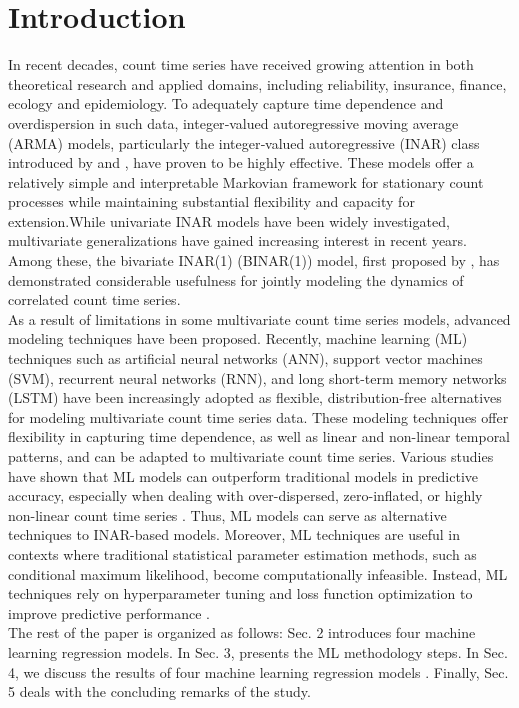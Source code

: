 \documentclass[twoside]{article}
\begin{document}
\section{Introduction}
In recent decades, count time series have received growing attention in both theoretical research and applied domains, including reliability, insurance, finance, ecology and epidemiology. To adequately capture time dependence and overdispersion in such data, integer‑valued autoregressive moving average (ARMA) models, particularly the integer‑valued autoregressive (INAR) class introduced by \cite{Al-Osh and  Alzaid: 1987} and \cite{McKenzie: 1986}, have proven to be highly effective. These models offer a relatively simple and interpretable Markovian framework for stationary count processes while maintaining substantial flexibility and capacity for extension.While univariate INAR models have been widely investigated, multivariate generalizations have gained increasing interest in recent years. Among these, the bivariate INAR(1) (BINAR(1)) model, first proposed by \cite{Pedeli and Karlis: 2013}, has demonstrated considerable usefulness for jointly modeling the dynamics of correlated count time series.\\
As a result of limitations in some multivariate count time series models, advanced modeling techniques have been proposed. Recently, machine learning (ML) techniques such as artificial neural networks (ANN), support vector machines (SVM), recurrent neural networks (RNN), and long short-term memory networks (LSTM) have been increasingly adopted as flexible, distribution-free alternatives for modeling multivariate count time series data. These modeling techniques offer flexibility in capturing time dependence, as well as linear and non-linear temporal patterns, and can be adapted to multivariate count time series. Various studies have shown that ML models can outperform traditional models in predictive accuracy, especially when dealing with over-dispersed, zero-inflated, or highly non-linear count time series \cite{Hewamalage : 2021, Lim : 2021} . Thus, ML models can serve as alternative techniques to INAR-based models. Moreover, ML techniques are useful in contexts where traditional statistical parameter estimation methods, such as conditional maximum likelihood, become computationally infeasible. Instead, ML techniques rely on hyperparameter tuning and loss function optimization to improve predictive performance \cite{Ilemobayo : 2024}.\\
The rest of the paper is organized as follows: 
Sec. 2  introduces  four machine learning regression models. In Sec. 3, presents the ML methodology steps. In Sec. 4, we discuss the results of four machine learning regression models . Finally, Sec. 5  deals with the concluding remarks of the study.
\end{document}
